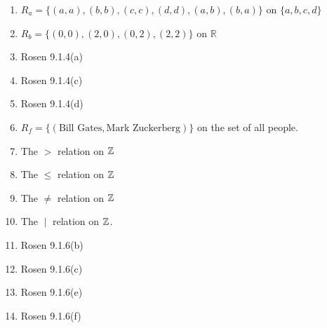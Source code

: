 \begin{questions}


\else
\begin{enumerate}[label=(\alph*),itemsep=0pt,parsep=0pt,topsep=0pt,partopsep=0pt]
	\item $R_a = \{ (a,a),(b,b),(c,c),(d,d),(a,b),(b,a) \}$ on $\{a, b, c, d\}$
	\item $R_b = \{ (0, 0), (2, 0), (0, 2), (2, 2) \}$ on $\mathbb{R}$ 
	\item Rosen 9.1.4(a) %
	\item Rosen 9.1.4(c) 
	\item Rosen 9.1.4(d) 
	\item $R_f = \{ (\text{Bill Gates}, \text{Mark Zuckerberg}) \}$ on the set of all people.
	\item The $>$ relation on $\mathbb{Z}$ 
	\item The $\leq$ relation on $\mathbb{Z}$ 
	\item The $\neq$ relation on $\mathbb{Z}$ 
	\item The $\;|\;$ relation on $\mathbb{Z}$. 
	\item Rosen 9.1.6(b)
	\item Rosen 9.1.6(c)
	\item Rosen 9.1.6(e) 
	\item Rosen 9.1.6(f) 
\end{enumerate}
\fi 


\end{questions}
